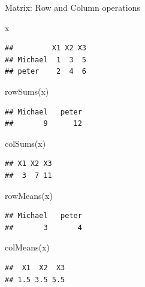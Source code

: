 \documentclass[
  9pt,
  ignorenonframetext,
]{beamer}
\newenvironment{Shaded}{\begin{snugshade}}{\end{snugshade}}
\newcommand{\KeywordTok}[1]{\textcolor[rgb]{0.94,0.87,0.69}{#1}}
\newcommand{\NormalTok}[1]{\textcolor[rgb]{0.80,0.80,0.80}{#1}}
\begin{document}
\begin{frame}[fragile]{Matrix: Row and Column operations}
\protect\hypertarget{matrix-row-and-column-operations}{}
\footnotesize

\begin{Shaded}
\begin{Highlighting}[]
\NormalTok{x}
\end{Highlighting}
\end{Shaded}

\begin{verbatim}
##         X1 X2 X3
## Michael  1  3  5
## peter    2  4  6
\end{verbatim}

\begin{Shaded}
\begin{Highlighting}[]
\KeywordTok{rowSums}\NormalTok{(x)}
\end{Highlighting}
\end{Shaded}

\begin{verbatim}
## Michael   peter 
##       9      12
\end{verbatim}

\begin{Shaded}
\begin{Highlighting}[]
\KeywordTok{colSums}\NormalTok{(x)}
\end{Highlighting}
\end{Shaded}

\begin{verbatim}
## X1 X2 X3 
##  3  7 11
\end{verbatim}

\begin{Shaded}
\begin{Highlighting}[]
\KeywordTok{rowMeans}\NormalTok{(x)}
\end{Highlighting}
\end{Shaded}

\begin{verbatim}
## Michael   peter 
##       3       4
\end{verbatim}

\begin{Shaded}
\begin{Highlighting}[]
\KeywordTok{colMeans}\NormalTok{(x)}
\end{Highlighting}
\end{Shaded}

\begin{verbatim}
##  X1  X2  X3 
## 1.5 3.5 5.5
\end{verbatim}


\end{frame}
\end{document}
